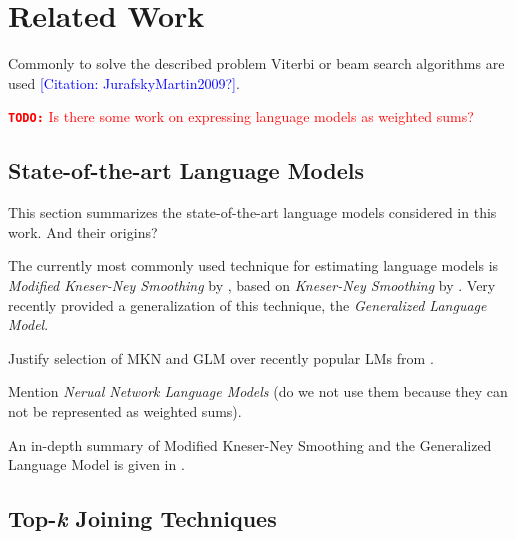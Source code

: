 \documentclass[m,bachelor,binding,palatino]{WeSTthesis}
\renewcommand\cref{\Cref}
\newenvironment{draft}{\color{draftcolor}}{}
\newcommand{\todo}[1]{\textcolor{red}{{\footnotesize\textbf{\texttt{TODO:}}} #1}}
\newcommand{\mbref}[1]{\textcolor{blue}{\footnotesize[Citation: #1?]}}
\begin{document}
\chapter{Related Work}

\begin{draft}
Commonly to solve the described problem Viterbi or beam search algorithms are
used \mbref{JurafskyMartin2009}.
\end{draft}

\todo{Is there some work on expressing language models as weighted sums?}

\section{State-of-the-art Language Models}

\begin{draft}
This section summarizes the state-of-the-art language models considered in this
work.
And their origins?
\end{draft}

The currently most commonly used \parencite{JurafskyMartin2009,Chelba2013}
technique for estimating language models is \emph{Modified Kneser-Ney Smoothing}
by \cite{ChenGoodman1996,ChenGoodman1998,ChenGoodman1999}, based on
\emph{Kneser-Ney Smoothing} by \cite{KneserNey1995}.
Very recently \cite{Pickhardt2014} provided a generalization of this technique,
the \emph{Generalized Language Model}.

\begin{draft}
Justify selection of MKN and GLM over recently popular LMs from
\parencite{Chelba2013}.

Mention \emph{Nerual Network Language Models} \parencite{Bengio2003,Mikolov2012}
(do we not use them because they can not be represented as weighted sums).
\end{draft}

An in-depth summary of Modified Kneser-Ney Smoothing and the Generalized
Language Model is given in \cref{ch:review-lm}.

\section{Top-\emph{k} Joining Techniques}
\end{document}
